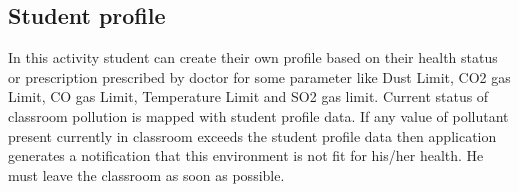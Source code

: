 \subsection{Student profile}
In this activity student can create their own profile based on their health status or prescription prescribed by doctor for some parameter like Dust Limit, CO2 gas Limit, CO gas Limit, Temperature Limit and SO2 gas limit. Current status of classroom pollution is mapped with student profile data. If any value of pollutant present currently in classroom exceeds the student profile data then application generates a notification that this environment is not fit for his/her health. He must leave the classroom as soon as possible. 

\begin{figure}
	\hfill
	\hfill

\end{figure}
